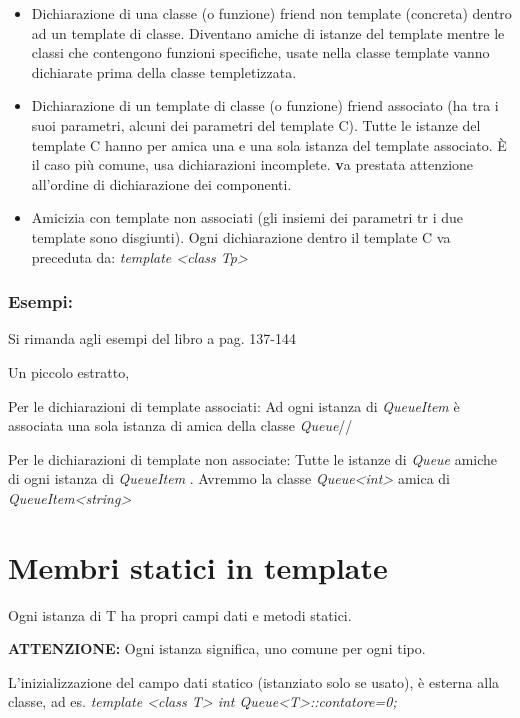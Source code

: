 \begin{itemize}
	\item Dichiarazione di una classe (o funzione) friend non template (concreta) dentro ad un template di classe. Diventano amiche di istanze del template mentre le classi che contengono funzioni specifiche, usate nella classe template vanno dichiarate prima della classe templetizzata.
	\item Dichiarazione di un template di classe (o funzione) friend associato (ha tra i suoi parametri, alcuni dei parametri del template C). Tutte le istanze del template C hanno per amica una e una sola istanza del template associato. \`{E} il caso pi\`{u} comune, usa dichiarazioni incomplete. \textbf va prestata attenzione all'ordine di dichiarazione dei componenti.
	\item Amicizia con template non associati (gli insiemi dei parametri tr i due template sono disgiunti). Ogni dichiarazione dentro il template C va preceduta da: \textit{template <class Tp>}
\end{itemize}

\subsubsection{Esempi:}
Si rimanda agli esempi del libro a pag. 137-144

Un piccolo estratto, 

Per le dichiarazioni di template associati: Ad ogni istanza di \textit{QueueItem} è associata una sola istanza di amica della classe \textit{Queue}//

Per le dichiarazioni di template non associate: Tutte le istanze di \textit{Queue} amiche di ogni istanza di \textit{QueueItem} . Avremmo la classe \textit{Queue<int>} amica di \textit{QueueItem<string>}

\section{Membri statici in template}
Ogni istanza di T ha propri campi dati e metodi statici. 

\textbf{ATTENZIONE:} Ogni istanza significa, uno comune per ogni tipo.

L'inizializzazione del campo dati statico (istanziato solo se usato), è esterna alla classe, ad es. \textit{template <class T> int Queue<T>::contatore=0;}